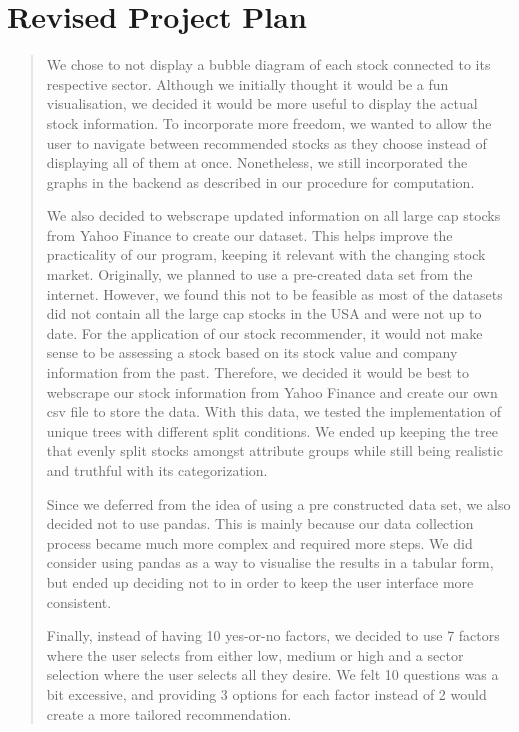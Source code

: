 \documentclass[fontsize=12pt]{article}
\begin{document}
\section*{Revised Project Plan}
\begin{quote}
\noindent We chose to not display a bubble diagram of each stock connected to its respective sector. Although we initially thought it would be a fun visualisation, we decided it would be more useful to display the actual stock information. To incorporate more freedom, we wanted to allow the user to navigate between recommended stocks as they choose instead of displaying all of them at once. Nonetheless, we still incorporated the graphs in the backend as described in our procedure for computation.  

We also decided to webscrape updated information on all large cap stocks from Yahoo Finance to create our dataset. This helps improve the practicality of our program, keeping it relevant with the changing stock market. Originally, we planned to use a pre-created data set from the internet. However, we found this not to be feasible as most of the datasets did not contain all the large cap stocks in the USA and were not up to date. For the application of our stock recommender, it would not make sense to be assessing a stock based on its stock value and company information from the past. Therefore, we decided it would be best to webscrape our stock information from Yahoo Finance and create our own csv file to store the data. With this data, we tested the implementation of unique trees with different split conditions. We ended up keeping the tree that evenly split stocks amongst attribute groups while still being realistic and truthful with its categorization.  

Since we deferred from the idea of using a pre constructed data set, we also decided not to use pandas. This is mainly because our data collection process became much more complex and required more steps. We did consider using pandas as a way to visualise the results in a tabular form, but ended up deciding not to in order to keep the user interface more consistent.  

Finally, instead of having 10 yes-or-no factors, we decided to use 7 factors where the user selects from either low, medium or high and a sector selection where the user selects all they desire. We felt 10 questions was a bit excessive, and providing 3 options for each factor instead of 2 would create a more tailored recommendation.
\end{quote}
\end{document}
